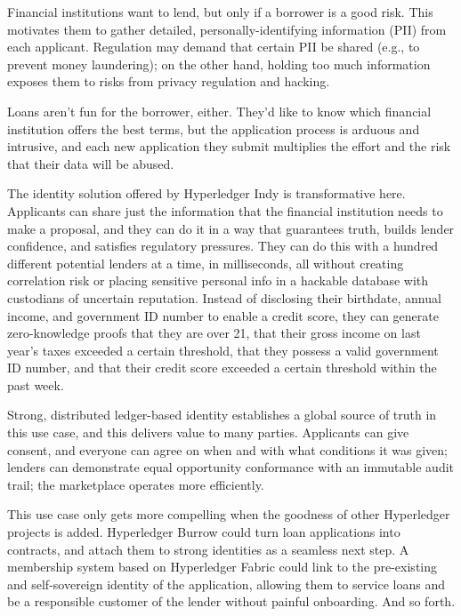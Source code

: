 Financial institutions want to lend, but only if a borrower is a good risk. This motivates them to gather detailed, personally-identifying information (PII) from each applicant. Regulation may demand that certain PII be shared (e.g., to prevent money laundering); on the other hand, holding too much information exposes them to risks from privacy regulation and hacking.

Loans aren’t fun for the borrower, either. They’d like to know which financial institution offers the best terms, but the application process is arduous and intrusive, and each new application they submit multiplies the effort and the risk that their data will be abused.

The identity solution offered by Hyperledger Indy is transformative here. Applicants can share just the information that the financial institution needs to make a proposal, and they can do it in a way that guarantees truth, builds lender confidence, and satisfies regulatory pressures. They can do this with a hundred different potential lenders at a time, in milliseconds, all without creating correlation risk or placing sensitive personal info in a hackable database with custodians of uncertain reputation. Instead of disclosing their birthdate, annual income, and government ID number to enable a credit score, they can generate zero-knowledge proofs that they are over 21, that their gross income on last year’s taxes exceeded a certain threshold, that they possess a valid government ID number, and that their credit score exceeded a certain threshold within the past week.

Strong, distributed ledger-based identity establishes a global source of truth in this use case, and this delivers value to many parties. Applicants can give consent, and everyone can agree on when and with what conditions it was given; lenders can demonstrate equal opportunity conformance with an immutable audit trail; the marketplace operates more efficiently.

This use case only gets more compelling when the goodness of other Hyperledger projects is added. Hyperledger Burrow could turn loan applications into contracts, and attach them to strong identities as a seamless next step. A membership system based on Hyperledger Fabric could link to the pre-existing and self-sovereign identity of the application, allowing them to service loans and be a responsible customer of the lender without painful onboarding. And so forth.

